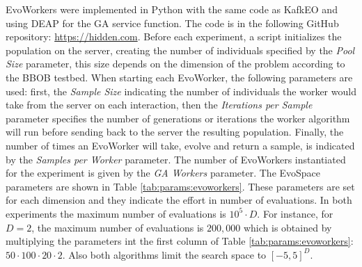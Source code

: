 \documentclass{llncs}
\begin{document}
  EvoWorkers were implemented in Python with the same code as KafkEO and using
  DEAP \cite{fortin2012deap} for the GA service function. The code is in the
  following GitHub repository: \url{https://hidden.com}. Before each
  experiment, a script initializes the population on the server, creating the
  number of individuals specified by the {\em Pool Size} parameter, this
  size depends on the dimension of the problem according to the BBOB testbed.
  When starting each EvoWorker, the following parameters are used: first, the
  {\em Sample Size} indicating the number of individuals the worker would take
  from the server on each interaction, then the {\em Iterations per Sample}
  parameter specifies the number of generations or iterations the worker algorithm
  will run before sending back to the server the resulting population. Finally,
  the number of times an  EvoWorker will take, evolve and return a sample, is
  indicated by the {\em Samples per Worker} parameter.
   The number of EvoWorkers instantiated for the experiment 
   is given by the {\em GA Workers} parameter.  The EvoSpace parameters
  are shown in Table \ref{tab:params:evoworkers}.
   These parameters are set for
  each dimension and they indicate the effort in number of evaluations. In both
   experiments the maximum number of evaluations is $10^5 \cdot D$. For instance,
   for $D = 2$, the maximum number of evaluations is $200,000$ which is 
   obtained by multiplying
    the parameters int the first column of Table \ref{tab:params:evoworkers}: $50 \cdot 100 \cdot 20 \cdot 2$. Also both algorithms limit the search space to $[-5,5]^D$.
\end{document}
